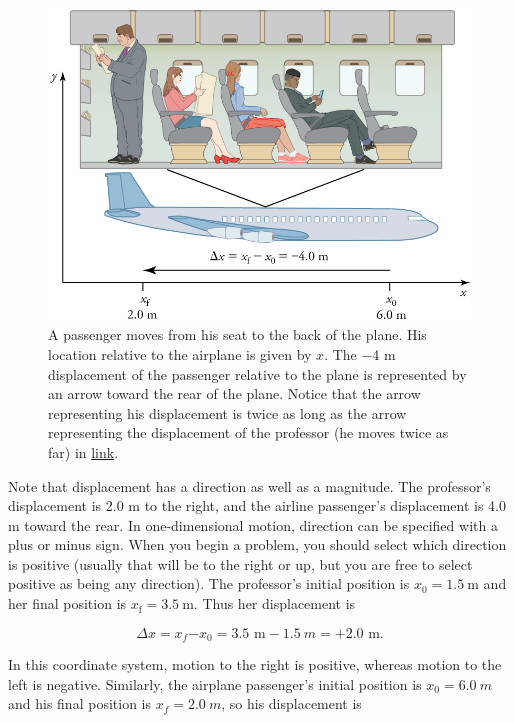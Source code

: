 \documentclass[
]{book}
\begin{document}
\begin{figure}
\hypertarget{import-auto-id2707699}{%
\centering
\includegraphics{images/Figure 02_01_02.jpg}
\caption{A passenger moves from his seat to the back of the plane. His location
relative to the airplane is given by \(x{}\). The −4 m displacement of the
passenger relative to the plane is represented by an arrow toward the
rear of the plane. Notice that the arrow representing his displacement
is twice as long as the arrow representing the displacement of the
professor (he moves twice as far) in
\protect\hyperlink{import-auto-id2972079}{link}.}\label{import-auto-id2707699}
}
\end{figure}

Note that displacement has a direction as well as a magnitude. The
professor's displacement is 2.0 m to the right, and the airline
passenger's displacement is 4.0 m toward the rear. In one-dimensional
motion, direction can be specified with a plus or minus sign. When you
begin a problem, you should select which direction is positive (usually
that will be to the right or up, but you are free to select positive as
being any direction). The professor's initial position is
\({{x_{0} = 1}\text{.}5\ \text{m}}{}\) and her final position is
\({{x_{\text{f}} = 3}\text{.}5\ \text{m}}{}\). Thus her displacement is

\leavevmode\hypertarget{eip-556}{}%
\[{{{\Delta x = x_{f}{- x_{0}} = 3}\text{.5\ m} - 1.5\ m = + 2\text{.0\ m}}.}{}\]

In this coordinate system, motion to the right is positive, whereas
motion to the left is negative. Similarly, the airplane passenger's
initial position is \({x_{0} = 6}\text{.}0\ m\) and his final position is
\({{x_{f} = 2}\text{.}0\ m}{}\), so his displacement is
\end{document}
